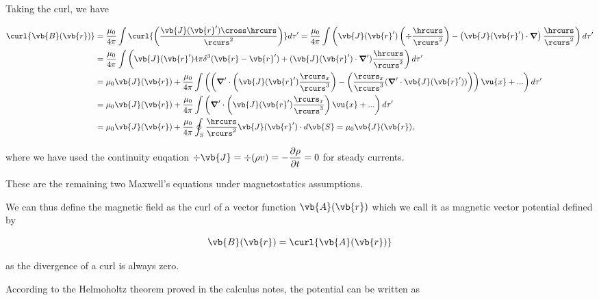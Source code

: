 \documentclass[english,a4paper,12pt]{report}
\begin{document}
Taking the curl, we have

\begin{equation}
    \begin{aligned} 
    \curl{\vb{B} (\vb{r} )} &=  \frac{\mu_0 }{4\pi } \int \curl{\left( \frac{\vb{J} (\vb{r} ') \cross \hrcurs}{\rcurs ^2 } \right)} d\tau ' =   \frac{\mu _{0} }{4\pi }\int \left(\vb{J} (\vb{r} ')\left( \div{\frac{\hrcurs }{\rcurs ^2} }  \right) - \left(\vb{J} (\vb{r} ')\cdot \boldsymbol{\nabla } \right)\frac{\hrcurs }{\rcurs ^2}  \right)  d\tau ' \\
    &= \frac{\mu_0 }{4\pi }\int \left( \vb{J} (\vb{r} ')4\pi \delta ^3 (\vb{r} -\vb{r} ') + (\vb{J}(\vb{r} ') \cdot \boldsymbol{\nabla }' )\frac{\hrcurs }{\rcurs ^2} \right)d\tau ' \\
    &= \mu_0 \vb{J} (\vb{r} ) + \frac{\mu_0 }{4\pi } \int \left(\left( \boldsymbol{\nabla }' \cdot \left( \vb{J} (\vb{r} ')  \frac{\rcurs _{x} }{\rcurs ^3 }   \right) - \left( \frac{\rcurs _{x} }{\rcurs ^3 } (\boldsymbol{\nabla }' \cdot \vb{J} (\vb{r} ') ) \right)  \right)\vu{x} + ...\right) d\tau ' \\
    &=  \mu_0 \vb{J} (\vb{r} )+ \frac{\mu_0 }{4\pi } \int \left( \boldsymbol{\nabla }' \cdot \left( \vb{J} (\vb{r} ')  \frac{\rcurs _{x} }{\rcurs ^3 }   \right)\vu{x} + ...\right) d\tau ' \\
    &= \mu_0 \vb{J} (\vb{r} ) + \frac{\mu_0 }{4\pi }  \oint_{S} \frac{\hrcurs }{\rcurs ^2} \vb{J} (\vb{r} ')\cdot d\vb{S} = \mu_0 \vb{J} (\vb{r} ),
    \end{aligned} 
\end{equation}

where we have used the continuity euqation \(\displaystyle \div{\vb{J} } = \div{(\rho v)}  = -\frac{\partial \rho }{\partial t} = 0\) for steady currents.  

These are the remaining two Maxwell's equations under magnetostatics assumptions.

We can thus define the magnetic field as the curl of a vector function \(\vb{A} (\vb{r} )\) which we call it as magnetic vector potential defined by 

\begin{equation}
    \vb{B} (\vb{r} ) = \curl{\vb{A} (\vb{r} )} 
\end{equation}

as the divergence of a curl is always zero.

According to the Helmoholtz theorem proved in the calculus notes, the potential can be written as  
\end{document}
